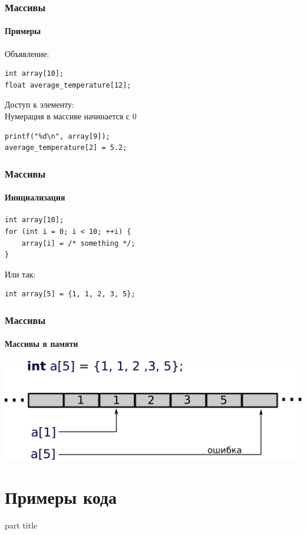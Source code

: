 \documentclass[14pt,pdf,hyperref={unicode}]{beamer}
\begin{document}
\begin{frame}[fragile]
\frametitle{Массивы} 
\framesubtitle{Примеры}
Объявление:\\
\begin{lstlisting}
int array[10];
float average_temperature[12];
\end{lstlisting}
Доступ к элементу:\\
Нумерация в массиве начинается с 0\\
\begin{lstlisting}
printf("%d\n", array[9]);
average_temperature[2] = 5.2;
\end{lstlisting}
\end{frame}

\begin{frame}[fragile]
\frametitle{Массивы} 
\framesubtitle{Инициализация}
\begin{lstlisting}
int array[10];
for (int i = 0; i < 10; ++i) {
    array[i] = /* something */;
}
\end{lstlisting}
Или так:\\
\begin{lstlisting}
int array[5] = {1, 1, 2, 3, 5};
\end{lstlisting}
\end{frame}

\begin{frame}[fragile]
\frametitle{Массивы} 
\framesubtitle{Массивы в памяти}
\begin{center}
\includegraphics[width=0.95\linewidth]{images/array_in_memory.png}
\end{center}
\end{frame}


\section{Примеры кода}
\begin{frame}
\begin{center}
\begin{beamercolorbox}[sep=8pt,center]{part
title}
\insertsection
\end{beamercolorbox}
\end{center}
\end{frame}
\end{document}
